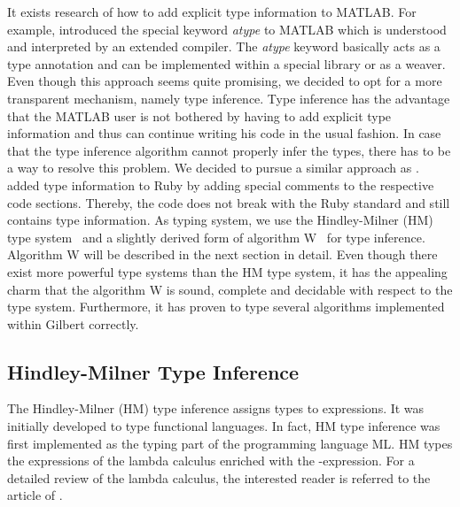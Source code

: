 It exists research of how to add explicit type information to MATLAB.
For example, \cite{hendren:2011a} introduced the special keyword \emph{atype} to MATLAB which is understood and interpreted by an extended compiler.
The \emph{atype} keyword basically acts as a type annotation and can be implemented within a special library or as a weaver.
Even though this approach seems quite promising, we decided to opt for a more transparent mechanism, namely type inference.
Type inference has the advantage that the MATLAB user is not bothered by having to add explicit type information and thus can continue writing his code in the usual fashion.
In case that the type inference algorithm cannot properly infer the types, there has to be a way to resolve this problem.
We decided to pursue a similar approach as \cite{furr:2009a}.
\cite{furr:2009a} added type information to Ruby by adding special comments to the respective code sections.
Thereby, the code does not break with the Ruby standard and still contains type information.
As typing system, we use the Hindley-Milner (HM) type system~\cite{hindley:tams1969a,milner:jcss1978a} and a slightly derived form of algorithm W~\cite{damas:1982a} for type inference.
Algorithm W will be described in the next section in detail.
Even though there exist more powerful type systems than the HM type system, it has the appealing charm that the algorithm W is sound, complete and decidable with respect to the type system.
Furthermore, it has proven to type several algorithms implemented within Gilbert correctly.

\subsection{Hindley-Milner Type Inference}
\label{sec:hmInference}

The Hindley-Milner (HM) type inference assigns types to expressions.
It was initially developed to type functional languages.
In fact, HM type inference was first implemented as the typing part of the programming language ML.
HM types the expressions of the lambda calculus enriched with the -expression.
For a detailed review of the lambda calculus, the interested reader is referred to the article of \cite{cardone:hhl2006a}.

